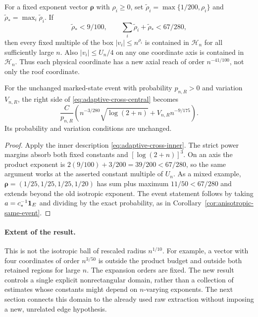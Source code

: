 \begin{corollary}
\label{cor:adaptive-cross-directions-event}
For a fixed exponent vector $\boldsymbol\rho$ with $\rho_i\ge0$, set
$\widetilde\rho_i=\max\{1/200,\rho_i\}$ and
$\widetilde\rho_* =\max_i\widetilde\rho_i$. If
\begin{equation}\label{eq:adaptive-cross-exponent-interior}
 \widetilde\rho_*<9/100,\qquad
 \sum_i\widetilde\rho_i+\widetilde\rho_*<67/280,
\end{equation}
then every fixed multiple of the box $|v_i|\le n^{\rho_i}$ is
contained in $\mathcal H_n$ for all sufficiently large $n$.
Also $|v_i|\le U_n/4$ on any one coordinate axis is contained in
$\mathcal H_n$. Thus each physical coordinate has a new axial reach
of order $n^{-41/100}$, not only the roof coordinate.

For the unchanged marked-state event with probability $p_{n,R}>0$
and variation $V_{n,R}$, the right side of
\eqref{eq:adaptive-cross-central} becomes
\[
 \frac C{p_{n,R}}\left(n^{-3/280}\sqrt{\log(2+n)}
                                    +V_{n,R}n^{-9/175}\right).
\]
Its probability and variation conditions are unchanged.
\end{corollary}
\begin{proof}
Apply the inner description \eqref{eq:adaptive-cross-inner}. The
strict power margins absorb both fixed constants and
$[\log(2+n)]^3$. On an axis the product exponent is
$2(9/100)+3/200=39/200<67/280$, so the same argument works at
the asserted constant multiple of $U_n$. As a mixed example,
$\boldsymbol\rho=(1/25,1/25,1/25,1/20)$ has sum plus maximum
$11/50<67/280$ and extends beyond the old isotropic exponent.
The event statement follows by taking $a=c_*^{-1}\mathbf1_E$ and
dividing by the exact probability, as in
Corollary~\ref{cor:anisotropic-same-event}.
\end{proof}

\paragraph{Extent of the result.}
This is not the isotropic ball of rescaled radius $n^{1/10}$.
For example, a vector with four coordinates of order $n^{3/50}$
is outside the product budget and outside both retained regions for
large $n$. The expansion orders are fixed. The new result controls a
single explicit nonrectangular domain, rather than a collection of
estimates whose constants might depend on $n$-varying exponents.
The next section connects this domain to the already used raw
extraction without imposing a new, unrelated edge hypothesis.
